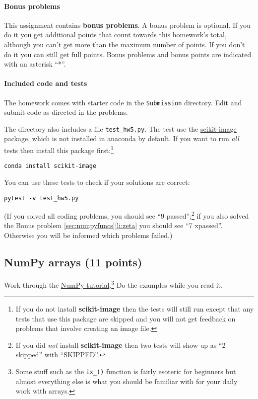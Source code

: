 \documentclass[letterpaper]{scrartcl}
\begin{document}
\paragraph{Bonus problems}

This assignment contains \textbf{bonus problems}. A bonus problem is
optional. If you do it you get additional points that count towards
this homework's total, although you can't get more than the maximum
number of points. If you don't do it you can still get full
points. Bonus problems and bonus points are indicated with an asterisk
``*''.

\paragraph{Included code and tests}

The homework comes with starter code in the \texttt{Submission}
directory. Edit and submit code as directed in the problems.

The directory also includes a file \texttt{test\_hw5.py}. The test use
the \href{https://scikit-image.org/}{scikit-image} package, which is
not installed in anaconda by default. If you want to run \emph{all}
tests then install this package first:\footnote{If you do not install
  \textbf{scikit-image} then the tests will still run except that any
  tests that use this package are skipped and you will not get
  feedback on problems that involve creating an image file.}
\begin{verbatim}
conda install scikit-image
\end{verbatim}
You can use these tests to check if your solutions are correct:
\begin{verbatim}
pytest -v test_hw5.py
\end{verbatim}
(If you solved all coding problems, you should see ``9
passed'';\footnote{If you did \emph{not} install \textbf{scikit-image}
then two tests will show up as ``2 skipped'' with ``SKIPPED''.} if
you also solved the Bonus problem \ref{sec:numpyfuncs}\ref{li:zeta}
you should see ``7 xpassed''. Otherwise you will be informed which
problems failed.)


\subsection{NumPy arrays (11 points)}

Work through the
\href{https://docs.scipy.org/doc/numpy/user/quickstart.html}{NumPy
  tutorial}.\footnote{Some stuff such as the \texttt{ix\_()} function
  is fairly esoteric for beginners but almost everything else is what
  you should be familiar with for your daily work with arrays.} Do
the examples while you read it.
\end{document}
